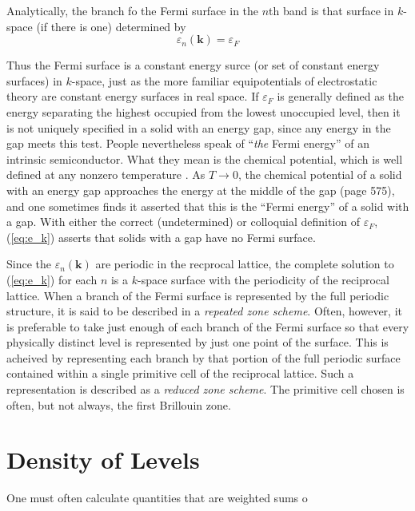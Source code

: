 	Analytically, the branch fo the Fermi surface in the $n$th band is that surface in $k$-space (if there is one) determined by
	\begin{equation} \label{eq:e_k}
		\varepsilon_n(\mathbf{k}) = \varepsilon_F
	\end{equation}

	Thus the Fermi surface is a constant energy surce (or set of constant energy surfaces)  in $k$-space, just as the more familiar equipotentials of electrostatic theory are constant energy surfaces in real space.
	If $\varepsilon_F$ is generally defined as the energy separating the highest occupied from the lowest unoccupied level, then it is not uniquely specified in a solid with an energy gap, since any energy in the gap meets this test. People nevertheless speak of ``\emph{the} Fermi energy'' of an intrinsic semiconductor. What they mean is the chemical potential, which is well defined at any nonzero temperature . As $T\rightarrow 0$, the chemical potential of a solid with an energy gap approaches the energy at the middle of the gap (page 575), and one sometimes finds it asserted that this is the ``Fermi energy'' of a solid with a gap. With either the correct (undetermined) or colloquial definition of $\varepsilon_F$, (\ref{eq:e_k}) asserts that solids with a gap have no Fermi surface.

	Since the $\varepsilon_n(\mathbf{k})$ are periodic in the recprocal lattice, the complete solution to (\ref{eq:e_k}) for each $n$ is a $k$-space surface with the periodicity of the reciprocal lattice. When a branch of the Fermi surface is represented by the full periodic structure, it is said to be described in a \emph{repeated zone scheme}. Often, however, it is preferable to take just enough of each branch of the Fermi surface so that every physically distinct level is represented by just one point of the surface. This is acheived by representing each branch by that portion of the full periodic surface contained within a single primitive cell of the reciprocal lattice. Such a representation is described as a \emph{reduced zone scheme}. The primitive cell chosen is often, but not always, the first Brillouin zone. 

\section{Density of Levels}
	One must often calculate quantities that are weighted sums o
